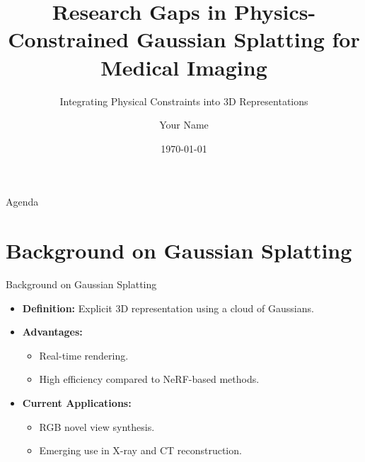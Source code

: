 \documentclass{beamer}
\title[Physics-Constrained Gaussian Splatting]{Research Gaps in Physics-Constrained Gaussian Splatting for Medical Imaging}
\subtitle{Integrating Physical Constraints into 3D Representations}
\author{Your Name}
\institute{Your Institution}
\date{\today}
\begin{document}
\begin{frame}
    \titlepage
\end{frame}

\begin{frame}{Agenda}
    \tableofcontents
\end{frame}

\section{Background on Gaussian Splatting}
\begin{frame}{Background on Gaussian Splatting}
    \begin{itemize}
        \item \textbf{Definition:} Explicit 3D representation using a cloud of Gaussians.
        \item \textbf{Advantages:}
        \begin{itemize}
            \item Real-time rendering.
            \item High efficiency compared to NeRF-based methods.
        \end{itemize}
        \item \textbf{Current Applications:}
        \begin{itemize}
            \item RGB novel view synthesis.
            \item Emerging use in X-ray and CT reconstruction.
        \end{itemize}
    \end{itemize}
\end{frame}

\end{document}
